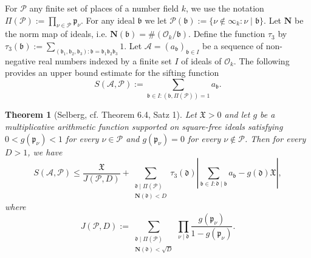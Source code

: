 \documentclass[11pt,letterpaper]{amsart}
\newcommand{\CA}{{\mathcal {A}}}
\newcommand{\CO}{{\mathcal {O}}}
\newcommand{\CP}{{\mathcal {P}}}
\theoremstyle{plain}
\numberwithin{equation}{section}
\newtheorem{theorem}{Theorem}[section]
\theoremstyle{definition}
\theoremstyle{remark}
\begin{document}
For $\CP$ any finite set of places of a number field $k$, we use the notation $\Pi(\CP):=\prod_{\nu\in\CP} \mathfrak{p}_\nu$. For any ideal $\mathfrak{b}$ we let $\CP(\mathfrak{b}):=\{\nu\notin\infty_k:\nu\mid \mathfrak{b}\}$.
Let $\mathbf{N}$ be the norm map of ideals, i.e. $\mathbf{N}(\mathfrak{b})=\#\left(\CO_k/\mathfrak{b}\right)$. Define the function $\tau_3$ by $\tau_3(\mathfrak{b}):=\sum_{(\mathfrak{b}_1,\mathfrak{b}_2,\mathfrak{b}_3):\mathfrak{b}=\mathfrak{b}_1\mathfrak{b}_2\mathfrak{b}_3}1$.
Let $\CA=(a_{\mathfrak{b}})_{\mathfrak{b}\in I}$ be a sequence of non-negative real numbers indexed by a finite set $I$ of ideals of $\CO_k$.
The following provides an upper bound estimate for the sifting function
$$S(\CA,\CP):=\sum_{\mathfrak{b}\in I:(\mathfrak{b},\Pi(\CP))=1}a_{\mathfrak{b}}.$$
\begin{theorem}[Selberg, cf. \cite{I-K} Theorem 6.4, \cite{Rieger} Satz 1]\label{thm:Selberg}
	Let $\mathfrak{X}>0$ and let $g$ be a multiplicative arithmetic function supported on square-free ideals satisfying $0<g(\mathfrak{p}_\nu)<1$ for every $\nu\in\CP$ and $g(\mathfrak{p}_\nu)=0$ for every $\nu\notin\CP$. Then for every $D>1$, we have
	$$S(\CA,\CP)\leqslant \frac{\mathfrak{X}}{J(\CP,D)}+\sum_{\substack{\mathfrak{d}\mid \Pi(\CP)\\\mathbf{N}(\mathfrak{d})<D}}\tau_3(\mathfrak{d})\left|\sum_{\mathfrak{b}\in I:\mathfrak{d}\mid \mathfrak{b}}a_{\mathfrak{b}}-g(\mathfrak{d})\mathfrak{X}\right|,$$ where $$J(\CP,D):=\sum_{\substack{\mathfrak{d}\mid \Pi(\CP)\\\mathbf{N}(\mathfrak{d})<\sqrt{D}}}\prod_{\nu\mid \mathfrak{d}}\frac{g(\mathfrak{p}_\nu)}{1-g(\mathfrak{p}_\nu)}.$$ 
\end{theorem}
\end{document}
